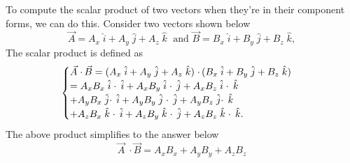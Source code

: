 \documentclass[12pt,addpoints]{exam}
\begin{document}
	To compute the scalar product of two vectors when they're in their component forms, we can do this. Consider two vectors shown below
	$$\vec{A} = A_{x}\; \hat{i} + A_{y}\; \hat{j} + A_{z}\; \hat{k}\; \text{ and } \vec{B} = B_{x}\; \hat{i} + B_{y}\; \hat{j} + B_{z}\; \hat{k},$$
	The scalar product is defined as
	$$\begin{cases} \vec{A}\; \cdotp \vec{B}  = (A_{x}\; \hat{i} + A_{y}\; \hat{j} + A_{z}\; \hat{k})\; \cdotp (B_{x}\; \hat{i} + B_{y}\; \hat{j} + B_{z}\; \hat{k}) \\  = A_{x}B_{x}\; \hat{i}\; \cdotp\; \hat{i} + A_{x}B_{y}\; \hat{i}\; \cdotp\; \hat{j} + A_{x}B_{z}\; \hat{i}\; \cdotp\; \hat{k} \\  + A_{y}B_{x}\; \hat{j} \cdotp\; \hat{i} + A_{y}B_{y}\; \hat{j}\; \cdotp\; \hat{j} + A_{y}B_{z}\; \hat{j} \cdotp\; \hat{k} \\  + A_{z}B_{x}\; \hat{k}\; \cdotp\; \hat{i} + A_{z}B_{y}\; \hat{k}\; \cdotp\; \hat{j} + A_{z}B_{z}\; \hat{k}\; \cdotp\; \hat{k} \ldotp \end{cases}$$
	The above product simplifies to the answer below
	$$\vec{A}\; \cdotp \vec{B} = A_{x}B_{x} + A_{y}B_{y} + A_{z}B_{z}$$
\end{document}
